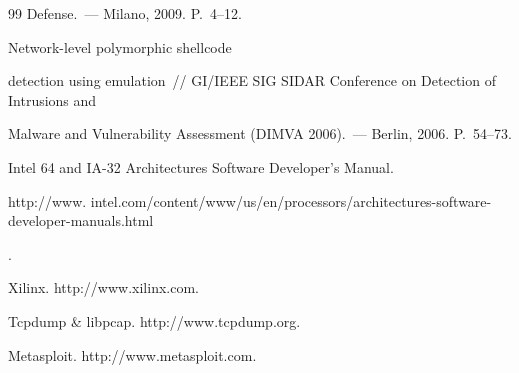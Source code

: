 {{\begin{thebibliography}{99}
Defense.~--- Milano, 2009. P.~4--12.




 Network-level polymorphic shellcode 


detection using emulation~/\!\!/ GI/IEEE SIG SIDAR Conference on Detection of Intrusions and 


Malware and Vulnerability Assessment (DIMVA 2006).~--- Berlin, 2006. P.~54--73.




Intel 64 and IA-32 Architectures Software Developer's Manual. {\sf 


http://www. intel.com/content/www/us/en/processors/architectures-software-developer-manuals.html}.




Xilinx. {\sf http://www.xilinx.com}.




Tcpdump \& libpcap. {\sf http://www.tcpdump.org}.





 \label{end\stat}


 




Metasploit. {\sf http://www.metasploit.com}.


 \end{thebibliography}


}


}


